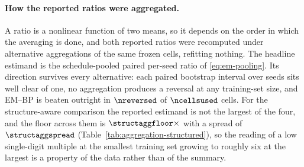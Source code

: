 \paragraph{How the reported ratios were aggregated.}\label{sec:aggregation-headline}
A ratio is a nonlinear function of two means, so it depends on the order in
which the averaging is done, and both reported ratios were recomputed under
alternative aggregations of the same frozen cells, refitting nothing. The
headline estimand is the schedule-pooled paired per-seed ratio of
\eqref{eq:em-pooling}. Its direction survives every alternative: each paired
bootstrap interval over seeds sits well clear of one, no aggregation produces
a reversal at any training-set size, and EM--BP is beaten outright in
$\nreversed$ of $\ncellsused$ cells. For the structure-aware comparison the
reported estimand is not the largest of the four, and the floor across them is
$\structaggfloor\times$ with a spread of $\structaggspread$
(Table~\ref{tab:aggregation-structured}), so the reading of a low single-digit
multiple at the smallest training set growing to roughly six at the largest is
a property of the data rather than of the summary.

\providecommand{\headlinetable}{Table~\ref{tab:pointwise}}
\providecommand{\structuredtable}{Table~\ref{tab:structured}}


\setlength{\emergencystretch}{0pt}
